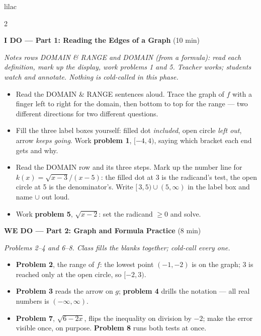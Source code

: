 \documentclass[10pt]{article}
\begin{document}
\begin{skillbox}{lilac}
\begin{multicols}{2}

\textbf{I DO --- Part 1: Reading the Edges of a Graph} (10 min)

\textit{Notes rows DOMAIN \& RANGE and DOMAIN (from a formula): read each definition, mark up
the display, work problems 1 and 5. Teacher works; students watch and annotate. Nothing is
cold-called in this phase.}
\begin{itemize}
  \item Read the DOMAIN \& RANGE sentences aloud. Trace the graph of $f$ with a finger left to
        right for the domain, then bottom to top for the range --- two different directions
        for two different questions.
  \item Fill the three label boxes yourself: filled dot \textit{included}, open circle
        \textit{left out}, arrow \textit{keeps going}. Work \textbf{problem 1}, $[-4, 4)$,
        saying which bracket each end gets and why.
  \item Read the DOMAIN row and its three steps. Mark up the number line for
        $k(x) = \sqrt{x - 3}/(x - 5)$: the filled dot at 3 is the radicand's test, the open
        circle at 5 is the denominator's. Write $[\,3, 5) \cup (5, \infty)$ in the label box
        and name $\cup$ out loud.
  \item Work \textbf{problem 5}, $\sqrt{x - 2}$: set the radicand $\ge 0$ and solve.
\end{itemize}

\textbf{WE DO --- Part 2: Graph and Formula Practice} (8 min)

\textit{Problems 2--4 and 6--8. Class fills the blanks together; cold-call every one.}
\begin{itemize}
  \item \textbf{Problem 2}, the range of $f$: the lowest point $(-1, -2)$ is on the graph; 3 is
        reached only at the open circle, so $[-2, 3)$.
  \item \textbf{Problem 3} reads the arrow on $g$; \textbf{problem 4} drills the notation ---
        all real numbers is $(-\infty, \infty)$.
  \item \textbf{Problem 7}, $\sqrt{6 - 2x}$, flips the inequality on division by $-2$; make the
        error visible once, on purpose. \textbf{Problem 8} runs both tests at once.
\end{itemize}

\columnbreak


\end{multicols}
\end{skillbox}
\end{document}
